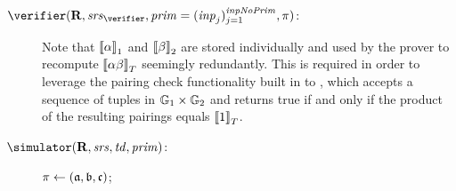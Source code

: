 \begin{description}
\item[$\verifier (\REL, \srs_\verifier, \priminputs = (\inputs_j)_{j = 1}^{\inpnoprim}, \pi)$:]\hfill
  Note that $\left\llbracket {\alpha} \right\rrbracket_{1}$ and $\left\llbracket {\beta} \right\rrbracket_{2}$ are stored individually and used by the prover to recompute $\left\llbracket {\alpha \beta} \right\rrbracket_{T}$ seemingly redundantly. This is required in order to leverage the pairing check functionality built in to \ethereum, which accepts a sequence of tuples in $\mathbb{G}_1 \times \mathbb{G}_2$ and returns true if and only if the product of the resulting pairings equals $\left\llbracket {1} \right\rrbracket_{T}$.

\item[$\simulator(\REL, \srs, \td, \priminputs)$:]\hfill
  \pcreturn $\pi \gets (\mathfrak{a}, \mathfrak{b}, \mathfrak{c})$;
\end{description}
